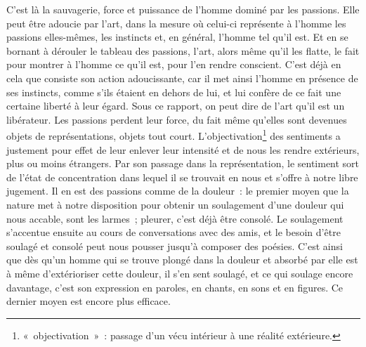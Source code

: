 {C'est là la sauvagerie, force et puissance de l'homme dominé par les
passions. Elle peut être adoucie par l'art, dans la mesure où
celui-ci représente à l'homme les passions elles-mêmes, les instincts
et, en général, l'homme tel qu'il est. Et en se bornant à dérouler le
tableau des passions, l'art, alors même qu'il les flatte, le fait
pour montrer à l'homme ce qu'il est, pour l'en rendre conscient.
C'est déjà en cela que consiste son action adoucissante, car il met
ainsi l'homme en présence de ses instincts, comme s'ils étaient en
dehors de lui, et lui confère de ce fait une certaine liberté à leur
égard. Sous ce rapport, on peut dire de l'art qu'il est un
libérateur. Les passions perdent leur force, du fait même qu'elles
sont devenues objets de représentations, objets tout court.
L'objectivation\footnote{«~objectivation~»~: passage d'un vécu
intérieur à une réalité extérieure.} des sentiments a justement pour
effet de leur enlever leur intensité et de nous les rendre
extérieurs, plus ou moins étrangers. Par son passage dans la
représentation, le sentiment sort de l'état de concentration dans
lequel il se trouvait en nous et s'offre à notre libre jugement. Il
en est des passions comme de la douleur~: le premier moyen que la
nature met à notre disposition pour obtenir un soulagement d'une
douleur qui nous accable, sont les larmes~; pleurer, c'est déjà être
consolé. Le soulagement s'accentue ensuite au cours de conversations
avec des amis, et le besoin d'être soulagé et consolé peut nous
pousser jusqu'à composer des poésies. C'est ainsi que dès qu'un homme
qui se trouve plongé dans la douleur et absorbé par elle est à même
d'extérioriser cette douleur, il s'en sent soulagé, et ce qui soulage
encore davantage, c'est son expression en paroles, en chants, en sons
et en figures. Ce dernier moyen est encore plus efficace.
}



